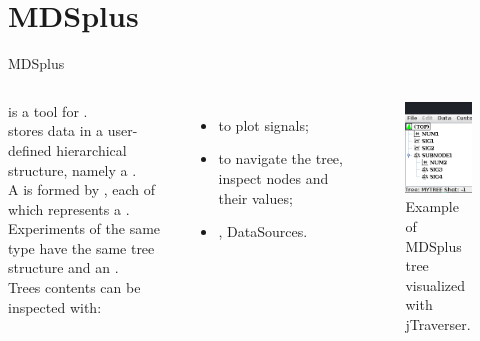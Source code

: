 
\section{MDSplus}
\graphicspath{{figs/section6/}}

\begin{frame}{MDSplus}
	\begin{columns}
		 is a tool for .\\
    \medskip
		 stores data in a user-defined hierarchical structure, namely a .\\
    \medskip
		A  is formed by , each of which represents a .\\
    \medskip
		Experiments of the same type have the same tree structure and an .\\
    \medskip
    Trees contents can be inspected with:
    \begin{itemize}
      \item {} to plot signals;
      \item {} to navigate the tree, inspect nodes and their values;
      \item {},  DataSources.
    \end{itemize}
		\begin{figure}
			\centering
			\includegraphics[scale=.5]{tree.png}
			\caption{Example of MDSplus tree\\visualized with jTraverser.}
			\label{fig:tree}
		\end{figure}
	\end{columns}
\end{frame}
